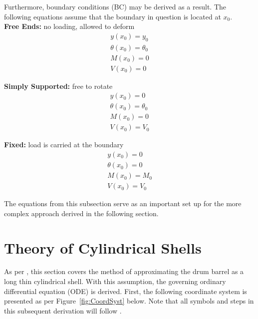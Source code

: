 Furthermore, boundary conditions (BC) may be derived as a result. The following equations assume that the boundary in question is located at $x_0$.\\

\textbf{Free Ends:} no loading, allowed to deform\\
\begin{equation}
	\label{eq:2_freeBC}
	\begin{aligned}
		y(x_0) = y_0          \\
		\theta(x_0)= \theta_0 \\
		M(x_0) = 0            \\
		V(x_0) = 0            
	\end{aligned}
\end{equation}

\textbf{Simply Supported:} free to rotate\\
\begin{equation}
	\label{eq:2_endBC}
	\begin{aligned}
		y(x_0)= 0            \\
		\theta(x_0)=\theta_0 \\
		M(x_0)= 0            \\
		V(x_0) =V_0          
	\end{aligned}
\end{equation}

\textbf{Fixed:} load is carried at the boundary\\
\begin{equation}
	\label{eq:2_fixedBC}
	\begin{aligned}
		y(x_0)=0      \\
		\theta(x_0)=0 \\
		M(x_0)=M_0    \\
		V(x_0) =V_0   
	\end{aligned}
\end{equation}

The equations from this subsection serve as an important set up for the more complex approach derived in the following section. 

\section{Theory of Cylindrical Shells}
\label{section:3_shells}

As per \cite{timoshenko1959theory}, this section covers the method of approximating the drum barrel as a long thin cylindrical shell. With this assumption, the governing ordinary differential equation (ODE) is derived. First, the following coordinate system is presented as per Figure~\ref{fig:CoordSyst} below. Note that all symbols and steps in this subsequent derivation will follow \cite{timoshenko1959theory}.

